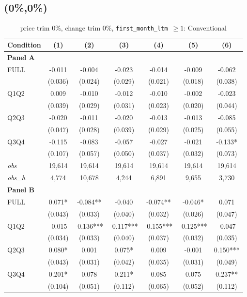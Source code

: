\subsection{(0\%,0\%)}
\begin{table}[!htbp]
\centering
\caption{price trim 0\%, change trim 0\%, \texttt{first\_month\_ltm $\geq 1$}: Conventional}
\label{tab:abc:trim00:ltm1:conventional}
\small
\begin{tabular}{lcccccc}
\toprule
Condition & (1) & (2) & (3) & (4) & (5) & (6) \\
\midrule
\textbf{Panel A} &&&&&&  \\

FULL & -0.011 & -0.004 & -0.023 & -0.014 & -0.009 & -0.062 \\
 & (0.036) & (0.024) & (0.029) & (0.021) & (0.018) & (0.038) \\
Q1Q2 & 0.009 & -0.010 & -0.012 & -0.010 & -0.002 & -0.023 \\
 & (0.039) & (0.029) & (0.031) & (0.023) & (0.020) & (0.044) \\
Q2Q3 & -0.020 & -0.011 & -0.020 & -0.013 & -0.013 & -0.085 \\
 & (0.047) & (0.028) & (0.039) & (0.029) & (0.025) & (0.055) \\
Q3Q4 & -0.115 & -0.083 & -0.057 & -0.027 & -0.021 & -0.133* \\
 & (0.107) & (0.057) & (0.050) & (0.037) & (0.032) & (0.073) \\

\textit{obs} & 19,614 & 19,614 & 19,614 & 19,614 & 19,614 & 19,614 \\
\textit{obs\_h} &  4,774 & 10,678 &  4,244 &  6,891 &  9,655 &  3,730 \\

\textbf{Panel B} &&&&&&  \\

FULL & 0.071* & -0.084** & -0.040 & -0.074** & -0.046* & 0.071 \\
 & (0.043) & (0.033) & (0.040) & (0.032) & (0.026) & (0.047) \\
Q1Q2 & -0.015 & -0.136*** & -0.117*** & -0.155*** & -0.125*** & -0.047 \\
 & (0.034) & (0.033) & (0.040) & (0.037) & (0.032) & (0.035) \\
Q2Q3 & 0.080* & 0.001 & 0.075* & 0.009 & -0.001 & 0.150*** \\
 & (0.043) & (0.031) & (0.042) & (0.035) & (0.031) & (0.049) \\
Q3Q4 & 0.201* & 0.078 & 0.211* & 0.085 & 0.075 & 0.237** \\
 & (0.104) & (0.051) & (0.112) & (0.065) & (0.052) & (0.112) \\


\end{tabular}
\end{table}

